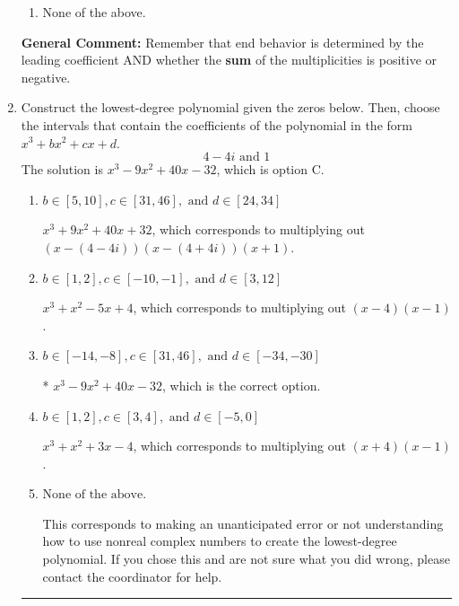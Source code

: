 \documentclass{extbook}[14pt]
\newcommand{\litem}[1]{\item #1

\rule{\textwidth}{0.4pt}}
\begin{document}
\begin{enumerate}
{\begin{enumerate}[label=\Alph*.]
\item None of the above.\end{enumerate}
\textbf{General Comment:} Remember that end behavior is determined by the leading coefficient AND whether the \textbf{sum} of the multiplicities is positive or negative.
}
\litem{
Construct the lowest-degree polynomial given the zeros below. Then, choose the intervals that contain the coefficients of the polynomial in the form $x^3+bx^2+cx+d$.
\[ 4 - 4 i \text{ and } 1 \]The solution is \( x^{3} -9 x^{2} +40 x -32 \), which is option C.\begin{enumerate}[label=\Alph*.]
\item \( b \in [5, 10], c \in [31, 46], \text{ and } d \in [24, 34] \)

$x^{3} +9 x^{2} +40 x + 32$, which corresponds to multiplying out $(x-(4 - 4 i))(x-(4 + 4 i))(x + 1)$.
\item \( b \in [1, 2], c \in [-10, -1], \text{ and } d \in [3, 12] \)

$x^{3} + x^{2} -5 x + 4$, which corresponds to multiplying out $(x -4)(x -1)$.
\item \( b \in [-14, -8], c \in [31, 46], \text{ and } d \in [-34, -30] \)

* $x^{3} -9 x^{2} +40 x -32$, which is the correct option.
\item \( b \in [1, 2], c \in [3, 4], \text{ and } d \in [-5, 0] \)

$x^{3} + x^{2} +3 x -4$, which corresponds to multiplying out $(x + 4)(x -1)$.
\item \( \text{None of the above.} \)

This corresponds to making an unanticipated error or not understanding how to use nonreal complex numbers to create the lowest-degree polynomial. If you chose this and are not sure what you did wrong, please contact the coordinator for help.
\end{enumerate}

}
\end{enumerate}
\end{document}
